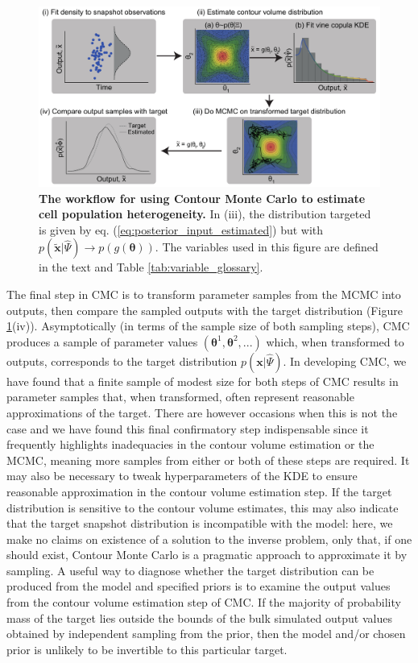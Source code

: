 \documentclass[10pt,letterpaper]{article}
\begin{document}
\begin{figure}[H]
	\centerline{\includegraphics[width=\textwidth]{../figures/workflow.pdf}}
	\caption{\textbf{The workflow for using Contour Monte Carlo to estimate cell population heterogeneity.} In (iii), the distribution targeted is given by eq. (\ref{eq:posterior_input_estimated}) but with $p(\tilde{\boldsymbol{x}}|\hat{\Psi})\rightarrow p(g(\boldsymbol{\theta}))$. The variables used in this figure are defined in the text and Table \ref{tab:variable_glossary}.}
	\label{fig:workflow}
\end{figure}

The final step in CMC is to transform parameter samples from the MCMC into outputs, then compare the sampled outputs with the target distribution (Figure \ref{fig:workflow}(iv)). Asymptotically (in terms of the sample size of both sampling steps), CMC produces a sample of parameter values $(\boldsymbol{\theta}^1,\boldsymbol{\theta}^2,...)$ which, when transformed to outputs, corresponds to the target distribution $p(\boldsymbol{x}|\hat{\Psi})$. In developing CMC, we have found that a finite sample of modest size for both steps of CMC results in parameter samples that, when transformed, often represent reasonable approximations of the target. There are however occasions when this is not the case and we have found this final confirmatory step indispensable since it frequently highlights inadequacies in the contour volume estimation or the MCMC, meaning more samples from either or both of these steps are required. It may also be necessary to tweak hyperparameters of the KDE to ensure reasonable approximation in the contour volume estimation step. If the target distribution is sensitive to the contour volume estimates, this may also indicate that the target snapshot distribution is incompatible with the model: here, we make no claims on existence of a solution to the inverse problem, only that, if one should exist, Contour Monte Carlo is a pragmatic approach to approximate it by sampling. A useful way to diagnose whether the target distribution can be produced from the model and specified priors is to examine the output values from the contour volume estimation step of CMC. If the majority of probability mass of the target lies outside the bounds of the bulk simulated output values obtained by independent sampling from the prior, then the model and/or chosen prior is unlikely to be invertible to this particular target. 
\end{document}
